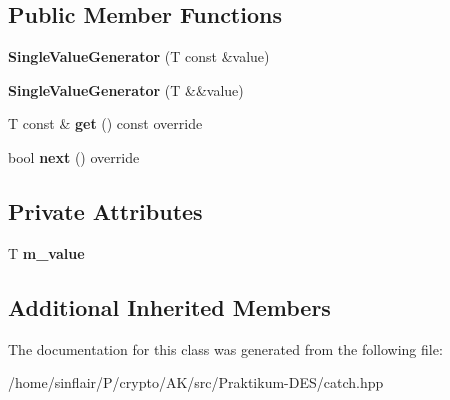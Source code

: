 \subsection*{Public Member Functions}
\begin{DoxyCompactItemize}
\item 
\mbox{\label{classCatch_1_1Generators_1_1SingleValueGenerator_a4bed2ad14ffe04102d8135e2c82b3ace}} 
{\bfseries Single\+Value\+Generator} (T const \&value)
\item 
\mbox{\label{classCatch_1_1Generators_1_1SingleValueGenerator_a532140dd2d1a673692271bb76a661ebe}} 
{\bfseries Single\+Value\+Generator} (T \&\&value)
\item 
\mbox{\label{classCatch_1_1Generators_1_1SingleValueGenerator_a5142058c52131a2471e7307972f99b50}} 
T const  \& {\bfseries get} () const override
\item 
\mbox{\label{classCatch_1_1Generators_1_1SingleValueGenerator_a10833b34e3ccbc484624185712eb8b6e}} 
bool {\bfseries next} () override
\end{DoxyCompactItemize}
\subsection*{Private Attributes}
\begin{DoxyCompactItemize}
\item 
\mbox{\label{classCatch_1_1Generators_1_1SingleValueGenerator_a93402a3203dad8ae7edcd681b1ed5938}} 
T {\bfseries m\+\_\+value}
\end{DoxyCompactItemize}
\subsection*{Additional Inherited Members}


The documentation for this class was generated from the following file\+:\begin{DoxyCompactItemize}
\item 
/home/sinflair/\+P/crypto/\+A\+K/src/\+Praktikum-\/\+D\+E\+S/catch.\+hpp\end{DoxyCompactItemize}
